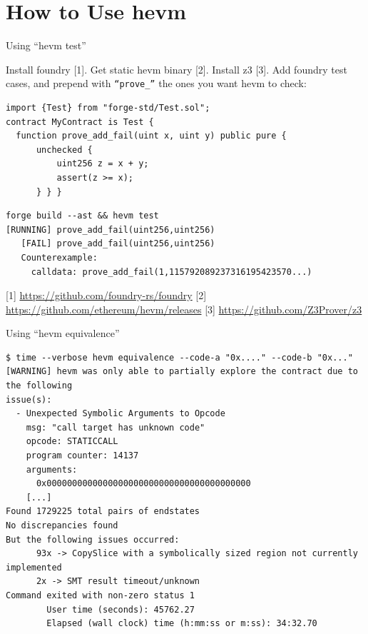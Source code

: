 \documentclass[aspectratio=169]{beamer}
\begin{document}
\section{How to Use hevm}

\begin{frame}[fragile=singleslide]{Using ``hevm test''}

Install foundry [1]. Get static hevm binary [2]. Install z3 [3]. Add foundry test cases, and prepend with \texttt{``prove\_''} the ones you want hevm to check:

\begin{Verbatim}[frame=single, framerule=0.2mm, framesep=2mm,fontsize=\footnotesize]
import {Test} from "forge-std/Test.sol";
contract MyContract is Test {
  function prove_add_fail(uint x, uint y) public pure {
      unchecked { 
          uint256 z = x + y;
          assert(z >= x);
      } } }
\end{Verbatim}

\begin{Verbatim}[frame=single, framerule=0.2mm, framesep=2mm,fontsize=\footnotesize]
forge build --ast && hevm test
[RUNNING] prove_add_fail(uint256,uint256)
   [FAIL] prove_add_fail(uint256,uint256)
   Counterexample:
     calldata: prove_add_fail(1,115792089237316195423570...)
\end{Verbatim}
\tiny [1] \url{https://github.com/foundry-rs/foundry} [2] \url{https://github.com/ethereum/hevm/releases} [3] \url{https://github.com/Z3Prover/z3}
\end{frame}

\begin{frame}[fragile=singleslide]{Using ``hevm equivalence''}
\begin{Verbatim}[frame=single, framerule=0.2mm, framesep=2mm,fontsize=\footnotesize]
$ time --verbose hevm equivalence --code-a "0x...." --code-b "0x..."
[WARNING] hevm was only able to partially explore the contract due to the following
issue(s):
  - Unexpected Symbolic Arguments to Opcode
    msg: "call target has unknown code"
    opcode: STATICCALL
    program counter: 14137
    arguments:
      0x0000000000000000000000000000000000000000
    [...]
Found 1729225 total pairs of endstates
No discrepancies found
But the following issues occurred:
      93x -> CopySlice with a symbolically sized region not currently implemented
      2x -> SMT result timeout/unknown
Command exited with non-zero status 1
        User time (seconds): 45762.27
        Elapsed (wall clock) time (h:mm:ss or m:ss): 34:32.70
\end{Verbatim}
\end{frame}
\end{document}
